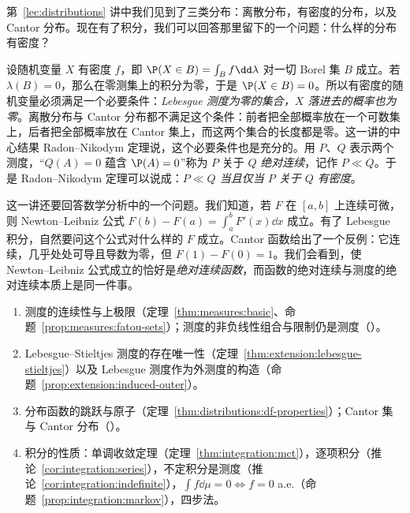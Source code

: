 \label{lec:absolute-continuity}

第~\ref{lec:distributions} 讲中我们见到了三类分布：离散分布，有密度的分布，以及 Cantor 分布。现在有了积分，我们可以回答那里留下的一个问题：什么样的分布有密度？

设随机变量 $X$ 有密度 $f$，即 $\P(X\in B)=\int_Bf\dd\lambda$ 对一切 Borel 集 $B$ 成立。若 $\lambda(B)=0$，那么在零测集上的积分为零，于是 $\P(X\in B)=0$。所以有密度的随机变量必须满足一个必要条件：\emph{Lebesgue 测度为零的集合，$X$ 落进去的概率也为零}。离散分布与 Cantor 分布都不满足这个条件：前者把全部概率放在一个可数集上，后者把全部概率放在 Cantor 集上，而这两个集合的长度都是零。这一讲的中心结果 Radon--Nikodym 定理说，这个必要条件也是充分的。用 $P$、$Q$ 表示两个测度，“$Q(A)=0$ 蕴含 $\P(A)=0$”称为 $P$ 关于 $Q$ \emph{绝对连续}，记作 $P\ll Q$。于是 Radon--Nikodym 定理可以说成：\emph{$P\ll Q$ 当且仅当 $P$ 关于 $Q$ 有密度}。

这一讲还要回答数学分析中的一个问题。我们知道，若 $F$ 在 $[a,b]$ 上连续可微，则 Newton--Leibniz 公式 $F(b)-F(a)=\int_a^bF'(x)\dd x$ 成立。有了 Lebesgue 积分，自然要问这个公式对什么样的 $F$ 成立。Cantor 函数给出了一个反例：它连续，几乎处处可导且导数为零，但 $F(1)-F(0)=1$。我们会看到，使 Newton--Leibniz 公式成立的恰好是\emph{绝对连续函数}，而函数的绝对连续与测度的绝对连续本质上是同一件事。


\begin{enumerate}
\item 测度的连续性与上极限（定理~\ref{thm:measures:basic}、命题~\ref{prop:measures:fatou-sets}）；测度的非负线性组合与限制仍是测度（）。
\item Lebesgue--Stieltjes 测度的存在唯一性（定理~\ref{thm:extension:lebesgue-stieltjes}）以及 Lebesgue 测度作为外测度的构造（命题~\ref{prop:extension:induced-outer}）。
\item 分布函数的跳跃与原子（定理~\ref{thm:distributions:df-properties}）；Cantor 集与 Cantor 分布（）。
\item 积分的性质：单调收敛定理（定理~\ref{thm:integration:mct}），逐项积分（推论~\ref{cor:integration:series}），不定积分是测度（推论~\ref{cor:integration:indefinite}），$\int f\dd\mu=0\iff f=0$ a.e.（命题~\ref{prop:integration:markov}），四步法。
\end{enumerate}

